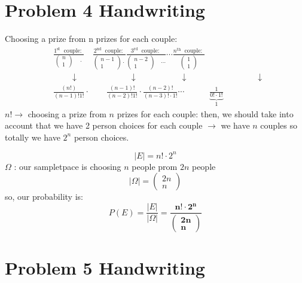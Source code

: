 \documentclass[a4paper,11pt]{article}
\theoremstyle{mytheor}
\begin{document}
\section{Problem 4 Handwriting}
Choosing a prize from n prizes for each couple:
$$
\begin{aligned}
& \frac{1^{\text {st }} \text { couple: }}{\left(\begin{array}{c}
n \\
1
\end{array}\right) \quad \cdot } \quad \frac{2^{\text {nd }} \text { couple: }}{\left(\begin{array}{c}
n-1 \\
1
\end{array}\right) \cdot } \frac{3^{\text {rd }} \text { couple: }}{\left(\begin{array}{c}
n-2 \\
1
\end{array}\right) \quad \cdots } \cdots \frac{n^{\text {th }} \text { couple: }}{\left(\begin{array}{c}
1 \\
1
\end{array}\right) } \\
& \quad \quad \downarrow \quad\quad\quad\quad\quad\quad \downarrow \quad\quad\quad\quad\quad\downarrow  \quad\quad\quad\quad\quad\quad\quad\quad\downarrow \\
& \frac{(n !)}{(n-1) ! 1 !} \cdot\quad\quad \frac{(n-1) !}{(n-2) ! 1 !} \cdot \frac{(n-2) !}{(n-3) ! \cdot 1 !} \cdots \quad\quad\quad\underbrace{\frac{1}{0 ! \cdot 1 !}}_1
\end{aligned}
$$
$n ! \rightarrow$ choosing a prize from $n$ prizes for each couple: then, we should take into account that we have 2 person choices for each couple $\rightarrow$ we have $n$ couples so totally we have $2^n$ person choices.

$$
|E|=n ! \cdot 2^n
$$
$\Omega$ : our sampletpace is choosing $n$ people prom $2 n$ people
$$
|\Omega|=\left(\begin{array}{c}
2 n \\
n
\end{array}\right)
$$
so, our probability is: $$P(E)=\frac{|E|}{|\Omega|}=\mathbf{\frac{n ! \cdot 2^n}{\left(\begin{array}{c}2 n \\ n\end{array}\right)}}$$

\newpage
\section{Problem 5 Handwriting}
\end{document}
